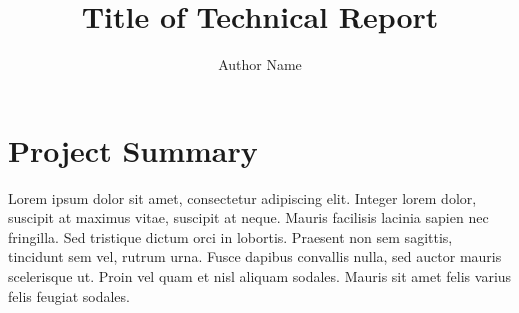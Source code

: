 \documentclass{anlreport}
\title{Title of Technical Report}
\author{Author Name}
\begin{document}
\setlength\parindent{1.5em}


\section{Project Summary}

Lorem ipsum dolor sit amet, consectetur adipiscing elit. Integer lorem dolor,
suscipit at maximus vitae, suscipit at neque. Mauris facilisis lacinia sapien
nec fringilla. Sed tristique dictum orci in lobortis. Praesent non sem sagittis,
tincidunt sem vel, rutrum urna. Fusce dapibus convallis nulla, sed auctor mauris
scelerisque ut. Proin vel quam et nisl aliquam sodales. Mauris sit amet felis
varius felis feugiat sodales.



%

\end{document}
